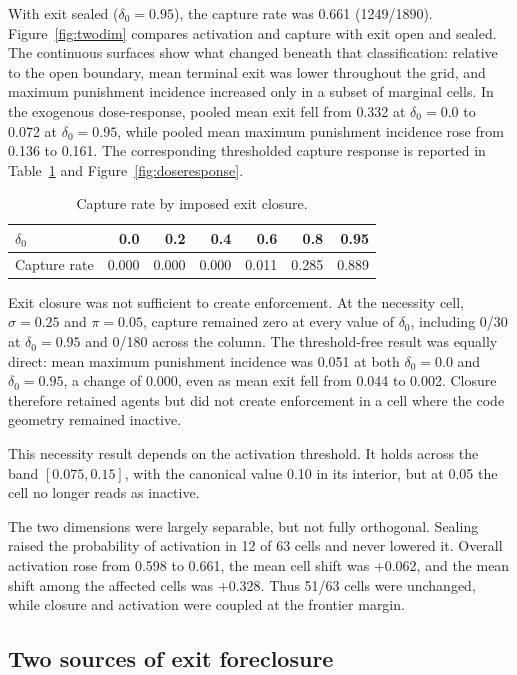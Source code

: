 \documentclass[12pt]{article}
\begin{document}
With exit sealed ($\delta_0=0.95$), the capture rate was 0.661 (1249/1890). Figure~\ref{fig:twodim} compares activation and capture with exit open and sealed. The continuous surfaces show what changed beneath that classification: relative to the open boundary, mean terminal exit was lower throughout the grid, and maximum punishment incidence increased only in a subset of marginal cells. In the exogenous dose-response, pooled mean exit fell from 0.332 at $\delta_0=0.0$ to 0.072 at $\delta_0=0.95$, while pooled mean maximum punishment incidence rose from 0.136 to 0.161. The corresponding thresholded capture response is reported in Table~\ref{tab:dose-response} and Figure~\ref{fig:doseresponse}.

\begin{table}[htbp]
\centering
\caption{Capture rate by imposed exit closure.}
\label{tab:dose-response}
\begin{tabular}{lrrrrrr}
\hline
$\delta_0$ & 0.0 & 0.2 & 0.4 & 0.6 & 0.8 & 0.95 \\
\hline
Capture rate & 0.000 & 0.000 & 0.000 & 0.011 & 0.285 & 0.889 \\
\hline
\end{tabular}
\end{table}

Exit closure was not sufficient to create enforcement. At the necessity cell, $\sigma=0.25$ and $\pi=0.05$, capture remained zero at every value of $\delta_0$, including 0/30 at $\delta_0=0.95$ and 0/180 across the column. The threshold-free result was equally direct: mean maximum punishment incidence was 0.051 at both $\delta_0=0.0$ and $\delta_0=0.95$, a change of 0.000, even as mean exit fell from 0.044 to 0.002. Closure therefore retained agents but did not create enforcement in a cell where the code geometry remained inactive.

This necessity result depends on the activation threshold. It holds across the band $[0.075,0.15]$, with the canonical value 0.10 in its interior, but at 0.05 the cell no longer reads as inactive.

The two dimensions were largely separable, but not fully orthogonal. Sealing raised the probability of activation in 12 of 63 cells and never lowered it. Overall activation rose from 0.598 to 0.661, the mean cell shift was +0.062, and the mean shift among the affected cells was +0.328. Thus 51/63 cells were unchanged, while closure and activation were coupled at the frontier margin.

\subsection{Two sources of exit foreclosure}
\end{document}
